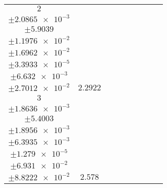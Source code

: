 \documentclass[8pt]{article}
\begin{document}
\begin{longtable}[l]{c c c c c c c c c}
$\num{2}$ & \begin{tabular}[c]{@{}c@{}}$\num{2.8339e-2}$ \\ $\pm\num{2.0865e-3}$\end{tabular} & \begin{tabular}[c]{@{}c@{}}$\num{-5.341e-2}$ \\ $\pm\num{5.9039}$\end{tabular} & \begin{tabular}[c]{@{}c@{}}$\num{-7.2882}$ \\ $\pm\num{1.1976e-2}$\end{tabular} & \begin{tabular}[c]{@{}c@{}}$\num{1.1724e+3}$ \\ $\pm\num{1.6962e-2}$\end{tabular} & \begin{tabular}[c]{@{}c@{}}$\num{2.3455}$ \\ $\pm\num{3.3933e-5}$\end{tabular} & \begin{tabular}[c]{@{}c@{}}$\num{1.1205}$ \\ $\pm\num{6.632e-3}$\end{tabular} & \begin{tabular}[c]{@{}c@{}}$\num{4.0558}$ \\ $\pm\num{2.7012e-2}$\end{tabular} & $\num{2.2922}$\\
$\num{3}$ & \begin{tabular}[c]{@{}c@{}}$\num{3.2634e-2}$ \\ $\pm\num{1.8636e-3}$\end{tabular} & \begin{tabular}[c]{@{}c@{}}$\num{-9.2074e-2}$ \\ $\pm\num{5.4003}$\end{tabular} & \begin{tabular}[c]{@{}c@{}}$\num{-7.07}$ \\ $\pm\num{1.8956e-3}$\end{tabular} & \begin{tabular}[c]{@{}c@{}}$\num{1.1727e+3}$ \\ $\pm\num{6.3935e-3}$\end{tabular} & \begin{tabular}[c]{@{}c@{}}$\num{2.3461}$ \\ $\pm\num{1.279e-5}$\end{tabular} & \begin{tabular}[c]{@{}c@{}}$\num{1.1898}$ \\ $\pm\num{6.931e-2}$\end{tabular} & \begin{tabular}[c]{@{}c@{}}$\num{3.9833}$ \\ $\pm\num{8.8222e-2}$\end{tabular} & $\num{2.578}$\\

\end{longtable}
\end{document}
